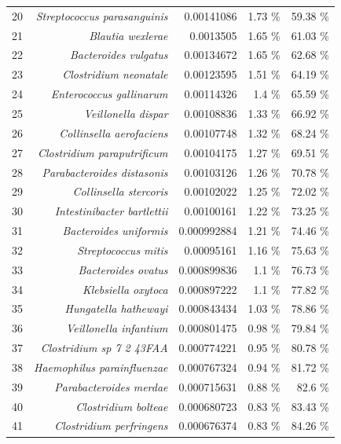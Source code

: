 \documentclass{article}
\begin{document}
\begin{table}
\begin{tabular}{|r|r|r|r|r|}
      20 & \textit{Streptococcus parasanguinis} & 0.00141086 & 1.73 \% & 59.38 \% \\
      21 & \textit{Blautia wexlerae} & 0.0013505 & 1.65 \% & 61.03 \% \\
      22 & \textit{Bacteroides vulgatus} & 0.00134672 & 1.65 \% & 62.68 \% \\
      23 & \textit{Clostridium neonatale} & 0.00123595 & 1.51 \% & 64.19 \% \\
      24 & \textit{Enterococcus gallinarum} & 0.00114326 & 1.4 \% & 65.59 \% \\
      25 & \textit{Veillonella dispar} & 0.00108836 & 1.33 \% & 66.92 \% \\
      26 & \textit{Collinsella aerofaciens} & 0.00107748 & 1.32 \% & 68.24 \% \\
      27 & \textit{Clostridium paraputrificum} & 0.00104175 & 1.27 \% & 69.51 \% \\
      28 & \textit{Parabacteroides distasonis} & 0.00103126 & 1.26 \% & 70.78 \% \\
      29 & \textit{Collinsella stercoris} & 0.00102022 & 1.25 \% & 72.02 \% \\
      30 & \textit{Intestinibacter bartlettii} & 0.00100161 & 1.22 \% & 73.25 \% \\
      31 & \textit{Bacteroides uniformis} & 0.000992884 & 1.21 \% & 74.46 \% \\
      32 & \textit{Streptococcus mitis} & 0.00095161 & 1.16 \% & 75.63 \% \\
      33 & \textit{Bacteroides ovatus} & 0.000899836 & 1.1 \% & 76.73 \% \\
      34 & \textit{Klebsiella oxytoca} & 0.000897222 & 1.1 \% & 77.82 \% \\
      35 & \textit{Hungatella hathewayi} & 0.000843434 & 1.03 \% & 78.86 \% \\
      36 & \textit{Veillonella infantium} & 0.000801475 & 0.98 \% & 79.84 \% \\
      37 & \textit{Clostridium sp 7 2 43FAA} & 0.000774221 & 0.95 \% & 80.78 \% \\
      38 & \textit{Haemophilus parainfluenzae} & 0.000767324 & 0.94 \% & 81.72 \% \\
      39 & \textit{Parabacteroides merdae} & 0.000715631 & 0.88 \% & 82.6 \% \\
      40 & \textit{Clostridium bolteae} & 0.000680723 & 0.83 \% & 83.43 \% \\
      41 & \textit{Clostridium perfringens} & 0.000676374 & 0.83 \% & 84.26 \% \\

\end{tabular}
\end{table}
\end{document}
